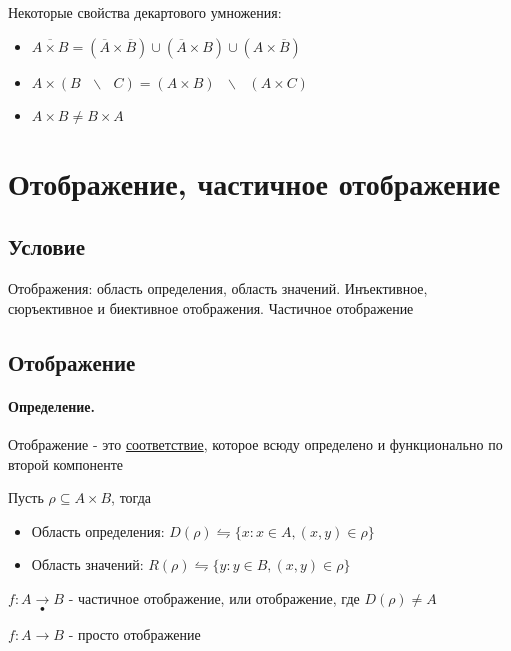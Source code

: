 \documentclass{report}
\newcommand{\bslash}{\mbox{ } \backslash \mbox{ }}
\begin{document}
Некоторые свойства декартового умножения:
\begin{itemize}
	\item $\overline{A \times B} = (\overline{A} \times \overline{B}) \cup (\overline{A} \times B) \cup (A \times \overline{B})$
	\item $A \times (B \bslash C) = (A \times B) \bslash (A \times C)$
	\item $A \times B \neq B \times A$
\end{itemize}
\newpage

\section{Отображение, частичное отображение}
\subsection{Условие}
Отображения: область определения, область значений. Инъективное, сюръективное и биективное отображения. Частичное отображение

\subsection{Отображение}
\paragraph*{Определение.}
Отображение - это \underline{соответствие},
которое всюду определено и функционально по второй компоненте



\medskip

Пусть $\rho \subseteq A \times B$, тогда
\begin{itemize}
	\item Область определения: $D(\rho) \leftrightharpoons \{x:x \in A, (x,y) \in \rho\}$
	\item Область значений: $R(\rho) \leftrightharpoons \{y:y \in B, (x,y) \in \rho\}$
\end{itemize}

$f: A \underset{\bullet}{\rightarrow} B$ - частичное отображение, или отображение, где $D(\rho) \neq A$

$f: A \rightarrow B$ - просто отображение
\end{document}
